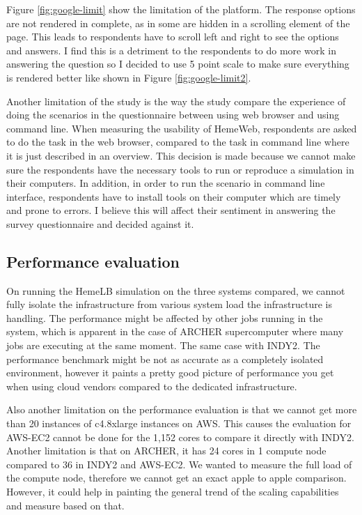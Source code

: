 \vspace{0.5cm}


Figure \ref{fig:google-limit} show the limitation of the platform. The response options are not rendered in complete, as in some are hidden in a scrolling element of the page. This leads to respondents have to scroll left and right to see the options and answers. I find this is a detriment to the respondents to do more work in answering the question so I decided to use 5 point scale to make sure everything is rendered better like shown in Figure \ref{fig:google-limit2}.


Another limitation of the study is the way the study compare the experience of doing the scenarios in the questionnaire between using web browser and using command line.  When measuring the usability of HemeWeb, respondents are asked to do the task in the web browser, compared to the task in command line where it is just described in an overview. This decision is made because we cannot make sure the respondents have the necessary tools to run or reproduce a simulation in their computers.  In addition, in order to run the scenario in command line interface, respondents have to install tools on their computer which are timely and prone to errors. I believe this will affect their sentiment in answering the survey questionnaire and decided against it.


\subsection{Performance evaluation}

On running the HemeLB simulation on the three systems compared, we cannot fully isolate the infrastructure from various system load the infrastructure is handling. The performance might be affected by other jobs running in the system, which is apparent in the case of ARCHER supercomputer where many jobs are executing at the same moment. The same case with INDY2. The performance benchmark might be not as accurate as a completely isolated environment, however it paints a pretty good picture of performance you get when using cloud vendors compared to the dedicated infrastructure. 

Also another limitation on the performance evaluation is that we cannot get more than 20 instances of c4.8xlarge instances on AWS. This causes the evaluation for AWS-EC2 cannot be done for the 1,152 cores to compare it directly with INDY2. Another limitation is that on ARCHER, it has 24 cores in 1 compute node compared to 36 in INDY2 and AWS-EC2. We wanted to measure the full load of the compute node, therefore we cannot get an exact apple to apple comparison. However, it could help in painting the general trend of the scaling capabilities and measure based on that.
 
